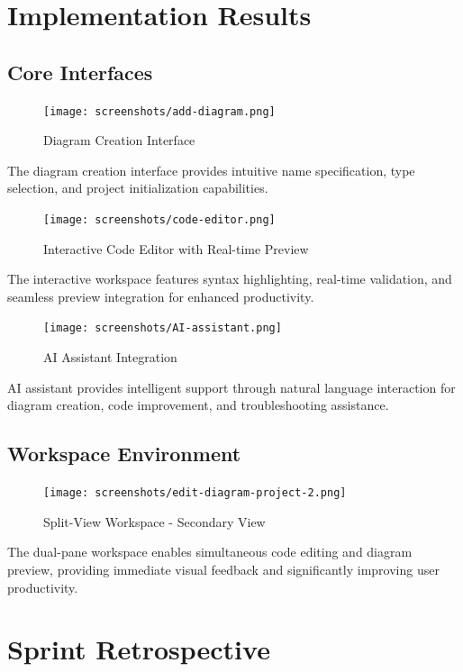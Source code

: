 \section{Implementation Results}

\subsection{Core Interfaces}

\begin{figure}[H]
\centering
\texttt{[image: screenshots/add-diagram.png]}
\caption{Diagram Creation Interface}
\end{figure}

The diagram creation interface provides intuitive name specification, type selection, and project initialization capabilities.

\begin{figure}[H]
\centering
\texttt{[image: screenshots/code-editor.png]}
\caption{Interactive Code Editor with Real-time Preview}
\end{figure}

The interactive workspace features syntax highlighting, real-time validation, and seamless preview integration for enhanced productivity.

\begin{figure}[H]
\centering
\texttt{[image: screenshots/AI-assistant.png]}
\caption{AI Assistant Integration}
\end{figure}

AI assistant provides intelligent support through natural language interaction for diagram creation, code improvement, and troubleshooting assistance.

\subsection{Workspace Environment}


\begin{figure}[H]
\centering
\texttt{[image: screenshots/edit-diagram-project-2.png]}
\caption{Split-View Workspace - Secondary View}
\end{figure}

The dual-pane workspace enables simultaneous code editing and diagram preview, providing immediate visual feedback and significantly improving user productivity.

\section{Sprint Retrospective}

